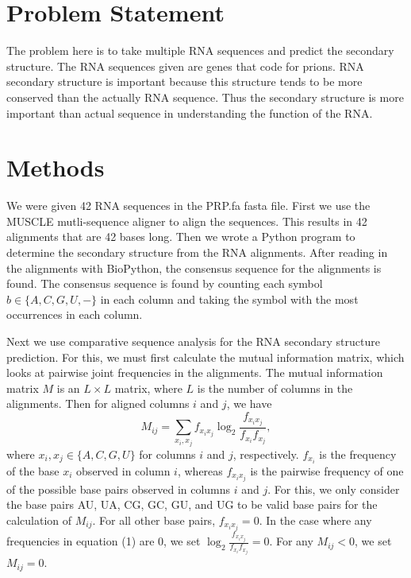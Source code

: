 \documentclass{acm_proc_article-sp}
\begin{document}
\section{Problem Statement}
The problem here is to take multiple RNA sequences and predict the secondary structure.  The RNA sequences given are genes that code for prions.  RNA secondary structure is important because this structure tends to be more conserved than the actually RNA sequence.  Thus the secondary structure is more important than actual sequence in understanding the function of the RNA.  

\section{Methods}
We were given 42 RNA sequences in the PRP.fa fasta file.  First we use the MUSCLE mutli-sequence aligner to align the sequences.  This results in 42 alignments that are 42 bases long.  Then we wrote a Python program to determine the secondary structure from the RNA alignments.  After reading in the alignments with BioPython, the consensus sequence for the alignments is found.  The consensus sequence is found by counting each symbol $b \in \{A, C, G, U, -\}$ in each column and taking the symbol with the most occurrences in each column.  

Next we use comparative sequence analysis for the RNA secondary structure prediction.  For this, we must first calculate the mutual information matrix, which looks at pairwise joint frequencies in the alignments.  The mutual information matrix $M$ is an $L \times L$ matrix, where $L$ is the number of columns in the alignments.  Then for aligned columns $i$ and $j$, we have 
\begin{equation} M_{ij} = \sum_{x_i,x_j} f_{x_ix_j} \log_2 \frac{f_{x_ix_j}}{f_{x_i}f_{x_j}}, \end{equation}
where $x_i,x_j \in \{A, C, G, U\}$ for columns $i$ and $j$, respectively.  $f_{x_i}$ is the frequency of the base $x_i$ observed in column $i$, whereas $f_{x_ix_j}$ is the pairwise frequency of one of the possible base pairs observed in columns $i$ and $j$.  For this, we only consider the base pairs AU, UA, CG, GC, GU, and UG to be valid base pairs for the calculation of $M_{ij}$.  For all other base pairs, $f_{x_ix_j} = 0$.  In the case where any frequencies in equation (1) are 0, we set $\log_2 \frac{f_{x_ix_j}}{f_{x_i}f_{x_j}} = 0$.  For any $M_{ij} < 0$, we set $M_{ij} = 0$.
\end{document}
